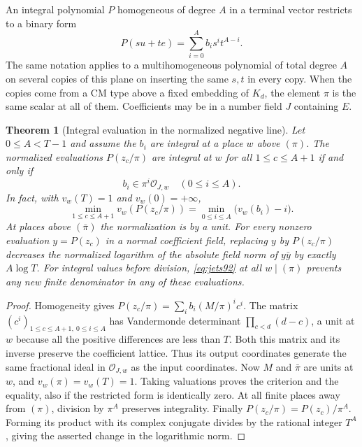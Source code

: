 \documentclass[a4paper,11pt]{article}
\newtheorem{theorem}[proposition]{Theorem}
\theoremstyle{definition}
\theoremstyle{remark}
\numberwithin{equation}{section}
\newcommand{\OO}{\mathcal O}
\begin{document}
An integral polynomial \(P\) homogeneous of degree \(A\) in a
terminal vector restricts to a binary form
\[
        P(su+te)=\sum_{i=0}^{A} b_i s^i t^{A-i}.
\]
The same notation applies to a multihomogeneous polynomial of
total degree \(A\) on several copies of this plane on inserting
the same \(s,t\) in every copy. When the copies come from a CM
type above a fixed embedding of \(K_d\), the element \(\pi\)
is the same scalar at all of them. Coefficients may be in a
number field \(J\) containing \(E\).

\begin{theorem}[Integral evaluation in the normalized negative line]
\label{thm:jets92}
Let \(0\le A<T-1\) and assume the \(b_i\) are integral at a
place \(w\) above \((\pi)\). The normalized evaluations
\(P(z_c/\pi)\) are integral at \(w\) for all \(1\le c\le A+1\)
if and only if
\begin{equation}
           b_i\in \pi^i\OO_{J,w}\quad(0\le i\le A).     \label{eq:jets92}
\end{equation}
In fact, with \(v_w(T)=1\) and \(v_w(0)=+\infty\),
\[
     \min_{1\le c\le A+1}v_w(P(z_c/\pi))
            =\min_{0\le i\le A}\bigl(v_w(b_i)-i\bigr).
\]
At places above \((\bar\pi)\) the normalization is by a unit.
For every nonzero evaluation \(y=P(z_c)\) in a normal coefficient
field, replacing \(y\) by \(P(z_c/\pi)\) decreases the normalized
logarithm of the absolute field norm of \(y\bar y\) by exactly
\(A\log T\). For integral values before division,
\eqref{eq:jets92} at all \(w\mid(\pi)\) prevents any new finite
denominator in any of these evaluations.
\end{theorem}
\begin{proof}
Homogeneity gives \(P(z_c/\pi)=\sum_i b_i(M/\pi)^i c^i\).
The matrix \((c^i)_{1\le c\le A+1,\ 0\le i\le A}\) has
Vandermonde determinant \(\prod_{c<d}(d-c)\), a unit at \(w\)
because all the positive differences are less than \(T\).
Both this matrix and its inverse preserve the coefficient
lattice. Thus its output coordinates generate the same
fractional ideal in \(\OO_{J,w}\) as the input coordinates.
Now \(M\) and \(\bar\pi\) are units at \(w\), and
\(v_w(\pi)=v_w(T)=1\). Taking valuations proves the criterion
and the equality, also if the restricted form is identically
zero. At all finite places away from \((\pi)\), division by
\(\pi^A\) preserves integrality. Finally \(P(z_c/\pi)=
P(z_c)/\pi^A\). Forming its product with its complex conjugate
divides by the rational integer \(T^A\), giving the asserted
change in the logarithmic norm.
\end{proof}
\end{document}
